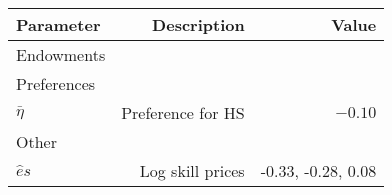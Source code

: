 \begin{tabular}{lrr}
\hline
Parameter & Description  & Value  \\
\hline
Endowments &   &   \\
Preferences &   &   \\
$\bar{\eta}$ & Preference for HS  & $-0.10$  \\
Other &   &   \\
$\hat{e}{s}$ & Log skill prices  & -0.33, -0.28, 0.08  \\
\hline
\end{tabular}%
